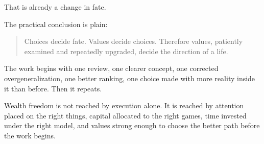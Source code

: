 That is already a change in fate.

The practical conclusion is plain:

\begin{quote}
Choices decide fate. Values decide choices. Therefore values, patiently examined and repeatedly upgraded, decide the direction of a life.
\end{quote}

The work begins with one review, one clearer concept, one corrected overgeneralization, one better ranking, one choice made with more reality inside it than before. Then it repeats.

Wealth freedom is not reached by execution alone. It is reached by attention placed on the right things, capital allocated to the right games, time invested under the right model, and values strong enough to choose the better path before the work begins.
